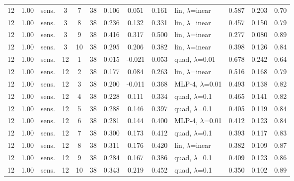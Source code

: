 \begin{scriptsize}
\begin{longtable}{cclcc c ccc l ccc}
12 & 1.00 & sens. & 3 & 7 & 38 & 0.106 & 0.051 & 0.161 & lin, $\lambda$=inear & 0.587 & 0.203 & 0.70 \\
12 & 1.00 & sens. & 3 & 8 & 38 & 0.236 & 0.132 & 0.331 & lin, $\lambda$=inear & 0.457 & 0.150 & 0.79 \\
12 & 1.00 & sens. & 3 & 9 & 38 & 0.416 & 0.317 & 0.500 & lin, $\lambda$=inear & 0.277 & 0.080 & 0.89 \\
12 & 1.00 & sens. & 3 & 10 & 38 & 0.295 & 0.206 & 0.382 & lin, $\lambda$=inear & 0.398 & 0.126 & 0.84 \\
12 & 1.00 & sens. & 12 & 1 & 38 & 0.015 & -0.021 & 0.053 & quad, $\lambda$=0.01 & 0.678 & 0.242 & 0.64 \\
12 & 1.00 & sens. & 12 & 2 & 38 & 0.177 & 0.084 & 0.263 & lin, $\lambda$=inear & 0.516 & 0.168 & 0.79 \\
12 & 1.00 & sens. & 12 & 3 & 38 & 0.200 & -0.011 & 0.368 & MLP-4, $\lambda$=0.01 & 0.493 & 0.138 & 0.82 \\
12 & 1.00 & sens. & 12 & 4 & 38 & 0.228 & 0.111 & 0.334 & quad, $\lambda$=0.1 & 0.465 & 0.141 & 0.82 \\
12 & 1.00 & sens. & 12 & 5 & 38 & 0.288 & 0.146 & 0.397 & quad, $\lambda$=0.1 & 0.405 & 0.119 & 0.84 \\
12 & 1.00 & sens. & 12 & 6 & 38 & 0.281 & 0.144 & 0.400 & MLP-4, $\lambda$=0.01 & 0.412 & 0.123 & 0.84 \\
12 & 1.00 & sens. & 12 & 7 & 38 & 0.300 & 0.173 & 0.412 & quad, $\lambda$=0.1 & 0.393 & 0.117 & 0.83 \\
12 & 1.00 & sens. & 12 & 8 & 38 & 0.311 & 0.176 & 0.420 & lin, $\lambda$=inear & 0.382 & 0.109 & 0.87 \\
12 & 1.00 & sens. & 12 & 9 & 38 & 0.284 & 0.167 & 0.386 & quad, $\lambda$=0.1 & 0.409 & 0.123 & 0.86 \\
12 & 1.00 & sens. & 12 & 10 & 38 & 0.343 & 0.219 & 0.452 & quad, $\lambda$=0.1 & 0.350 & 0.102 & 0.89 \\
\end{longtable}
\end{scriptsize}